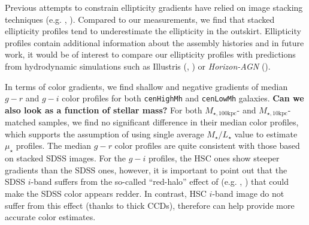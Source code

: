 \documentclass[a4paper,fleqn,usenatbib]{mnras}
\def\rbcg{\texttt{cenHighMh}}
\def\nbcg{\texttt{cenLowMh}}
\def\minn{{$M_{\star,10\mathrm{kpc}}$}}
\def\mtot{{$M_{\star,100\mathrm{kpc}}$}}
\def\m2l{{$M_{\star}/L_{\star}$}}
\def\mden{{$\mu_{\star}$}}
\begin{document}
    Previous attempts to constrain ellipticity gradients have relied on image 
    stacking techniques (e.g. \citealt{Tal2011}, \citealt{DSouza2015}). 
    Compared to our measurements, we find that stacked ellipticity profiles tend to 
    underestimate the ellipticity in the outskirt. 
    Ellipticity profiles contain additional information about the assembly histories 
    and in future work, it would be of interest to compare our ellipticity profiles 
    with predictions from hydrodynamic simulations such as Illustris 
    (\citealt{Vogelsberger2014}, \citealt{Genel2014}) or \textit{Horizon-AGN} 
    (\citealt{Dubois2014}).
    
    In terms of color gradients, we find shallow and negative gradients of median 
    $g-r$ and $g-i$ color profiles for both \rbcg{} and \nbcg{} galaxies. 
    {\bf Can we also look as a function of stellar mass?}
    For both \mtot{}- and \minn{}-matched samples, we find no significant difference
    in their median color profiles, which supports the assumption of using single 
    average \m2l{} value to estimate \mden{} profiles.
    The median $g-r$ color profiles are quite consistent with those based on 
    stacked SDSS images. 
    For the $g-i$ profiles, the HSC ones show steeper gradients than the SDSS ones, 
    however, it is important to point out that the SDSS $i$-band suffers from the 
    so-called ``red-halo'' effect of (e.g. \citealt{Wu2005}, \citealt{Tal2011}) that 
    could make the SDSS color appears redder. 
    In contrast, HSC $i$-band image do not suffer from this effect (thanks to thick 
    CCDs), therefore can help provide more accurate color estimates.
     
\end{document}
